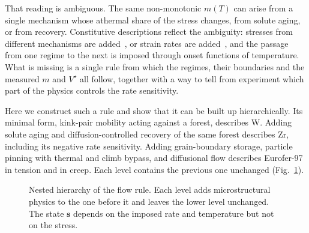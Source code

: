 \documentclass[aps,prl,twocolumn,superscriptaddress,amsmath,amssymb,floatfix]{revtex4-2}
\newcommand{\gd}{\dot\gamma}
\newcommand{\ts}{\tau^{\star}}
\begin{document}
That reading is ambiguous. The same non-monotonic $m(T)$ can arise from a single mechanism whose athermal share of the stress changes, from solute aging, or from recovery. Constitutive descriptions reflect the ambiguity: stresses from different mechanisms are added~\cite{Seeger,KocksArgonAshby,EstrinMcCormick}, or strain rates are added~\cite{FrostAshby}, and the passage from one regime to the next is imposed through onset functions of temperature. What is missing is a single rule from which the regimes, their boundaries and the measured $m$ and $V^\star$ all follow, together with a way to tell from experiment which part of the physics controls the rate sensitivity.

Here we construct such a rule and show that it can be built up hierarchically. Its minimal form, kink-pair mobility acting against a forest, describes W. Adding solute aging and diffusion-controlled recovery of the same forest describes Zr, including its negative rate sensitivity. Adding grain-boundary storage, particle pinning with thermal and climb bypass, and diffusional flow describes Eurofer-97 in tension and in creep. Each level contains the previous one unchanged (Fig.~\ref{fig:scheme}).

\begin{figure}[b]
\centering
{}
\caption{Nested hierarchy of the flow rule. Each level adds microstructural physics to the one before it and leaves the lower level unchanged. The state $\bm s$ depends on the imposed rate and temperature but not on the stress.}
\label{fig:scheme}
\end{figure}
\end{document}
